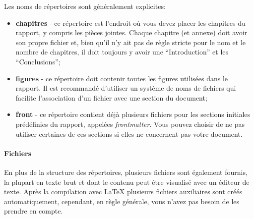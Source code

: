 Les noms de répertoires sont généralement explicites:
\begin{itemize}
     \item \textbf{chapitres} - ce répertoire est l'endroit où vous devez placer les chapitres du rapport, y compris les pièces jointes. Chaque chapitre (et annexe) doit avoir son propre fichier  et, bien qu'il n'y ait pas de règle stricte pour le nom et le nombre de chapitres, il doit toujours y avoir une ``Introduction'' et les ``Conclusions'';

     \item \textbf{figures} - ce répertoire doit contenir toutes les figures utilisées dans le rapport. Il est recommandé d'utiliser un système de noms de fichiers qui facilite l'association d'un fichier avec une section du document;

     \item \textbf{front} - ce répertoire contient déjà plusieurs fichiers pour les sections initiales prédéfinies du rapport, appelées \textit{frontmatter}. Vous pouvez choisir de ne pas utiliser certaines de ces sections si elles ne concernent pas votre document.
\end{itemize}

\paragraph{Fichiers}
En plus de la structure des répertoires, plusieurs fichiers sont également fournis, la plupart en texte brut et dont le contenu peut être visualisé avec un éditeur de texte. Après la compilation avec \LaTeX{} plusieurs fichiers auxiliaires sont créés automatiquement, cependant, en règle générale, vous n'avez pas besoin de les prendre en compte.

